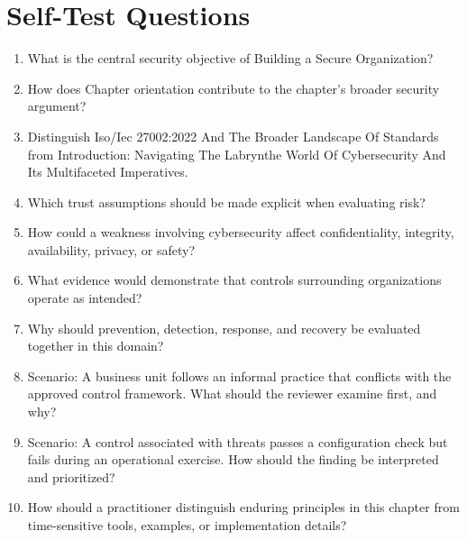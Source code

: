 \documentclass[11pt,letterpaper]{article}
\begin{document}
\section*{Self-Test Questions}
\begin{enumerate}
\item What is the central security objective of Building a Secure Organization?
\item How does Chapter orientation contribute to the chapter's broader security argument?
\item Distinguish Iso/Iec 27002:2022 And The Broader Landscape Of Standards from Introduction: Navigating The Labrynthe World Of Cybersecurity And Its Multifaceted Imperatives.
\item Which trust assumptions should be made explicit when evaluating risk?
\item How could a weakness involving cybersecurity affect confidentiality, integrity, availability, privacy, or safety?
\item What evidence would demonstrate that controls surrounding organizations operate as intended?
\item Why should prevention, detection, response, and recovery be evaluated together in this domain?
\item Scenario: A business unit follows an informal practice that conflicts with the approved control framework. What should the reviewer examine first, and why?
\item Scenario: A control associated with threats passes a configuration check but fails during an operational exercise. How should the finding be interpreted and prioritized?
\item How should a practitioner distinguish enduring principles in this chapter from time-sensitive tools, examples, or implementation details?
\end{enumerate}
\end{document}
